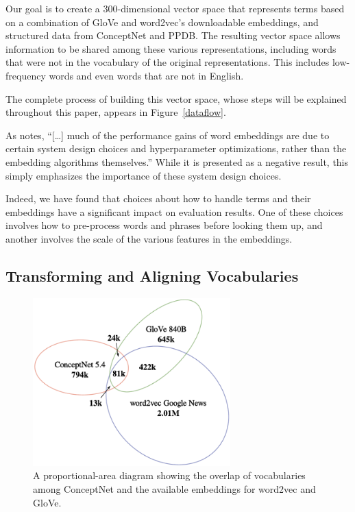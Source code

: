 \documentclass[11pt,letterpaper]{article}
\begin{document}
Our goal is to create a 300-dimensional vector space that represents terms based
on a combination of GloVe and word2vec's downloadable embeddings, and structured
data from ConceptNet and PPDB. The resulting vector space allows information to
be shared among these various representations, including words that were not in
the vocabulary of the original representations. This includes low-frequency words
and even words that are not in English.

The complete process of building this vector space, whose steps will be explained
throughout this paper, appears in Figure~\ref{dataflow}.

As  notes,
``[\ldots] much of the performance gains of word embeddings are due to certain
system design choices and hyperparameter optimizations, rather than the
embedding algorithms themselves.'' While it is presented as a negative result,
this simply emphasizes the importance of these system design choices.

Indeed, we have found that choices about how to handle terms and their
embeddings have a significant impact on evaluation results. One of these choices
involves how to pre-process words and phrases before looking them up, and
another involves the scale of the various features in the embeddings.


\subsection{Transforming and Aligning Vocabularies}
\label{standardizing-text}

\begin{figure}
\centering
\includegraphics[width=3.0in]{areas.pdf}
\caption{
    A proportional-area diagram showing the overlap of vocabularies among
    ConceptNet and the available embeddings for word2vec and GloVe.
}
\label{vocabulary-overlap}
\end{figure}
\end{document}

